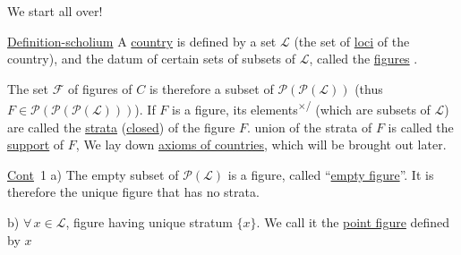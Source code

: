We start all over!

\uline{Definition-scholium} A \uline{country}  is defined by a set $\mathcal{L}$ (the set of \uline{loci} of the country), and the datum of certain sets of subsets of $\mathcal{L}$, called the \uline{figures} .

The set $\mathcal{F}$ of figures of $C$ is therefore a  subset of $\mathcal{P}(\mathcal{P}(\mathcal{L}))$ (thus $F\in \mathcal{P}(\mathcal{P}(\mathcal{P}(\mathcal{L})))$). If $F$ is a figure, its elements\textsuperscript{$\times$/} (which are subsets of $\mathcal{L}$) are called the \uline{strata} (\uline{closed}) of the figure $F$.  union of the strata  of $F$ is called the \uline{support} of $F$,  We lay down \uline{axioms of countries}, which will be brought out later.

\uline{Cont}~1 \quad a) The empty subset of $\mathcal{P}(\mathcal{L})$ is a  figure, called ``\uline{empty figure}''. It is therefore the unique figure that has no strata.

\margin{$\big\Vert$}
b) $\forall\,x\in \mathcal{L}$,  figure having  unique stratum $\{x\}$. We call it the \uline{point figure} defined by $x$
